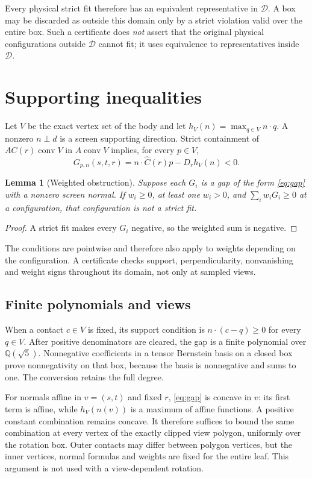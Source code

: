 \documentclass[11pt,a4paper]{article}
\newtheorem{lemma}[theorem]{Lemma}
\newcommand{\conv}{\operatorname{conv}}
\newcommand{\Q}{\mathbb Q}
\begin{document}
Every physical strict fit therefore has an equivalent representative in
$\mathcal D$. A box may be discarded as outside this domain only by a strict
violation valid over the entire box. Such a certificate does \emph{not} assert
that the original physical configurations outside $\mathcal D$ cannot fit;
it uses equivalence to representatives inside $\mathcal D$.

\section{Supporting inequalities}\label{sec:inequalities}
Let $V$ be the exact vertex set of the body and let
$h_V(n)=\max_{q\in V} n\cdot q$. A nonzero $n\perp d$ is a screen supporting
direction. Strict containment of $AC(r)\conv V$ in $A\conv V$ implies, for
every $p\in V$,
\begin{equation}\label{eq:gap}
 G_{p,n}(s,t,r)=n\cdot\widehat C(r)p-D_r h_V(n)<0.
\end{equation}
\begin{lemma}[Weighted obstruction]\label{lem:gap}
Suppose each $G_i$ is a gap of the form \eqref{eq:gap} with a nonzero screen
normal. If $w_i\ge0$, at least one $w_i>0$, and $\sum_i w_iG_i\ge0$ at a
configuration, that configuration is not a strict fit.
\end{lemma}
\begin{proof}
A strict fit makes every $G_i$ negative, so the weighted sum is negative.
\end{proof}
The conditions are pointwise and therefore also apply to weights depending
on the configuration. A certificate checks support, perpendicularity,
nonvanishing and weight signs throughout its domain, not only at sampled views.

\subsection{Finite polynomials and views}
When a contact $c\in V$ is fixed, its support condition is
$n\cdot(c-q)\ge0$ for every $q\in V$. After positive denominators are cleared,
the gap is a finite polynomial over $\Q(\sqrt5)$. Nonnegative coefficients in a
tensor Bernstein basis on a closed box prove nonnegativity on that box, because
the basis is nonnegative and sums to one. The conversion retains the full degree.

For normals affine in $v=(s,t)$ and fixed $r$, \eqref{eq:gap} is concave in $v$:
its first term is affine, while $h_V(n(v))$ is a maximum of affine functions.
A positive constant combination remains concave. It therefore suffices to
bound the same combination at every vertex of the exactly clipped view
polygon, uniformly over the rotation box. Outer contacts may differ between
polygon vertices, but the inner vertices, normal formulas and weights are fixed
for the entire leaf. This argument is not used with a view-dependent rotation.
\end{document}
